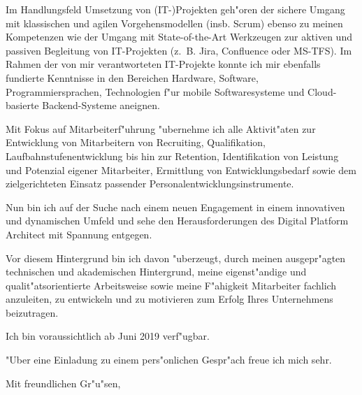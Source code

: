 \documentclass[11pt,a4paper]{dinbrief}
\begin{document}
\begin{letter}
Im Handlungsfeld Umsetzung von (IT-)Projekten geh"oren der sichere Umgang mit klassischen und agilen Vorgehensmodellen (insb. Scrum) ebenso zu meinen Kompetenzen wie der Umgang mit State-of-the-Art Werkzeugen zur aktiven und passiven Begleitung von IT-Projekten (z.~B. Jira, Confluence oder MS-TFS). Im Rahmen der von mir verantworteten IT-Projekte konnte ich mir ebenfalls fundierte Kenntnisse in den Bereichen Hardware, Software, Programmiersprachen, Technologien f"ur mobile Softwaresysteme und Cloud-basierte Backend-Systeme aneignen.

Mit Fokus auf Mitarbeiterf"uhrung "ubernehme ich alle Aktivit"aten zur Entwicklung von Mitarbeitern von Recruiting, Qualifikation, Laufbahnstufenentwicklung bis hin zur Retention, Identifikation von Leistung und Potenzial eigener Mitarbeiter, Ermittlung von Entwicklungsbedarf sowie dem zielgerichteten Einsatz passender Personalentwicklungsinstrumente.

Nun bin ich auf der Suche nach einem neuen Engagement in einem innovativen und dynamischen Umfeld und sehe den Herausforderungen des Digital Platform Architect mit Spannung entgegen.

Vor diesem Hintergrund bin ich davon "uberzeugt, durch meinen ausgepr"agten technischen und akademischen Hintergrund, meine eigenst"andige und qualit"atsorientierte Arbeitsweise sowie meine F"ahigkeit Mitarbeiter fachlich anzuleiten, zu entwickeln und zu motivieren zum Erfolg Ihres Unternehmens beizutragen.

Ich bin voraussichtlich ab Juni 2019 verf"ugbar.

"Uber eine Einladung zu einem pers"onlichen Gespr"ach freue ich mich sehr.

\closing{Mit freundlichen Gr"u"sen,}
\end{letter}
\end{document}
